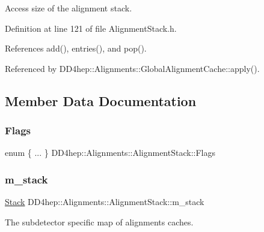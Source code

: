 Access size of the alignment stack. 



Definition at line 121 of file Alignment\+Stack.\+h.



References add(), entries(), and pop().



Referenced by D\+D4hep\+::\+Alignments\+::\+Global\+Alignment\+Cache\+::apply().



\subsection{Member Data Documentation}
\hypertarget{class_d_d4hep_1_1_alignments_1_1_alignment_stack_acf79d8d4af7ef5666d1096280c8da3e8}{}\label{class_d_d4hep_1_1_alignments_1_1_alignment_stack_acf79d8d4af7ef5666d1096280c8da3e8} 
\subsubsection{\texorpdfstring{Flags}{Flags}}
{\footnotesize\ttfamily enum \{ ... \}   D\+D4hep\+::\+Alignments\+::\+Alignment\+Stack\+::\+Flags}

\hypertarget{class_d_d4hep_1_1_alignments_1_1_alignment_stack_ae6d6fe967fc507fc1275e15f5cbff876}{}\label{class_d_d4hep_1_1_alignments_1_1_alignment_stack_ae6d6fe967fc507fc1275e15f5cbff876} 
\subsubsection{\texorpdfstring{m\+\_\+stack}{m\_stack}}
{\footnotesize\ttfamily \hyperlink{class_d_d4hep_1_1_alignments_1_1_alignment_stack_a14076338e30231119d5d291b5ac316ee}{Stack} D\+D4hep\+::\+Alignments\+::\+Alignment\+Stack\+::m\+\_\+stack\hspace{0.3cm}{\ttfamily [protected]}}



The subdetector specific map of alignments caches. 



